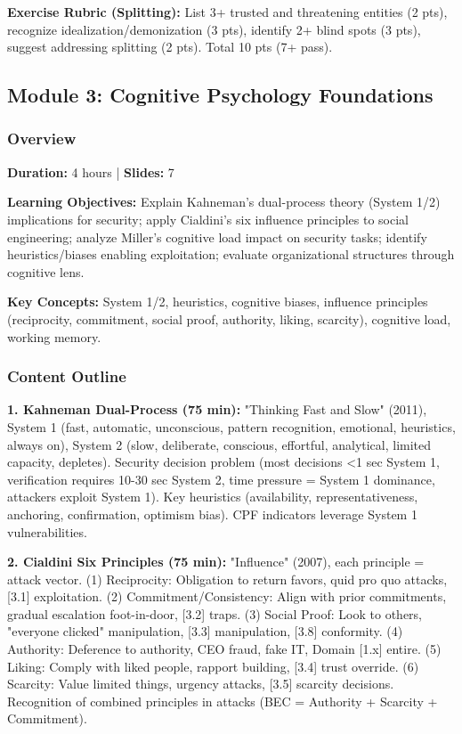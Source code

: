 \documentclass[11pt,a4paper]{article}
\begin{document}
\textbf{Exercise Rubric (Splitting):} List 3+ trusted and threatening entities (2 pts), recognize idealization/demonization (3 pts), identify 2+ blind spots (3 pts), suggest addressing splitting (2 pts). Total 10 pts (7+ pass).

\subsection{Module 3: Cognitive Psychology Foundations}

\subsubsection{Overview}
\textbf{Duration:} 4 hours | \textbf{Slides:} 7

\textbf{Learning Objectives:} Explain Kahneman's dual-process theory (System 1/2) implications for security; apply Cialdini's six influence principles to social engineering; analyze Miller's cognitive load impact on security tasks; identify heuristics/biases enabling exploitation; evaluate organizational structures through cognitive lens.

\textbf{Key Concepts:} System 1/2, heuristics, cognitive biases, influence principles (reciprocity, commitment, social proof, authority, liking, scarcity), cognitive load, working memory.

\subsubsection{Content Outline}
\textbf{1. Kahneman Dual-Process (75 min):} "Thinking Fast and Slow" (2011), System 1 (fast, automatic, unconscious, pattern recognition, emotional, heuristics, always on), System 2 (slow, deliberate, conscious, effortful, analytical, limited capacity, depletes). Security decision problem (most decisions <1 sec System 1, verification requires 10-30 sec System 2, time pressure = System 1 dominance, attackers exploit System 1). Key heuristics (availability, representativeness, anchoring, confirmation, optimism bias). CPF indicators leverage System 1 vulnerabilities.

\textbf{2. Cialdini Six Principles (75 min):} "Influence" (2007), each principle = attack vector. (1) Reciprocity: Obligation to return favors, quid pro quo attacks, [3.1] exploitation. (2) Commitment/Consistency: Align with prior commitments, gradual escalation foot-in-door, [3.2] traps. (3) Social Proof: Look to others, "everyone clicked" manipulation, [3.3] manipulation, [3.8] conformity. (4) Authority: Deference to authority, CEO fraud, fake IT, Domain [1.x] entire. (5) Liking: Comply with liked people, rapport building, [3.4] trust override. (6) Scarcity: Value limited things, urgency attacks, [3.5] scarcity decisions. Recognition of combined principles in attacks (BEC = Authority + Scarcity + Commitment).
\end{document}
